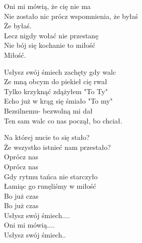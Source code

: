 \begin{text}
    Oni mi mówią, że cię nie ma\\
    Nie zostało nic prócz wspomnienia, że byłaś\\
    Że byłaś.\\
    Lecz nigdy wołać nie przestanę\\
    Nie bój się kochanie to miłość\\
    Miłość.

    Usłysz swój śmiech zachęty gdy walc\\
    Ze mną obcym do piekieł cię rwał\\
    Tylko krzyknąć zdążyłem "To Ty"\\
    Echo już w krąg się śmiało "To my"\\
    Bezsilnemu- bezwolną mi dał\\
    Ten sam walc co nas począł, bo chciał.

    Na której nucie to się stało?\\
    Że wszystko istnieć nam przestało?\\
    Oprócz nas\\
    Oprócz nas\\
    Gdy rytmu tańca nie starczyło\\
    Łamiąc go runęliśmy w miłość\\
    Bo już czas\\
    Bo już czas\\

    Usłysz swój śmiech....\\
    Oni mi mówią....\\
    Usłysz swój śmiech..
\end{text}
\begin{chord}

\end{chord}